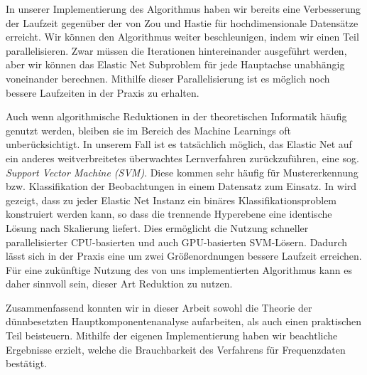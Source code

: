 In unserer Implementierung des Algorithmus haben wir bereits eine Verbesserung der Laufzeit gegenüber der von Zou und Hastie für hochdimensionale Datensätze erreicht. Wir können den Algorithmus weiter beschleunigen, indem wir einen Teil parallelisieren. Zwar müssen die Iterationen hintereinander ausgeführt werden, aber wir können das Elastic Net Subproblem für jede Hauptachse unabhängig voneinander berechnen. Mithilfe dieser Parallelisierung ist es möglich noch bessere Laufzeiten in der Praxis zu erhalten.

Auch wenn algorithmische Reduktionen in der theoretischen Informatik häufig genutzt werden, bleiben sie im Bereich des Machine Learnings oft unberücksichtigt. In unserem Fall ist es tatsächlich möglich, das Elastic Net auf ein anderes weitverbreitetes überwachtes Lernverfahren zurückzuführen, eine sog. \textit{Support Vector Machine (SVM)}. Diese kommen sehr häufig für Mustererkennung bzw. Klassifikation der Beobachtungen in einem Datensatz zum Einsatz. In \cite{zhou} wird gezeigt, dass zu jeder Elastic Net Instanz ein binäres Klassifikationsproblem konstruiert werden kann, so dass die trennende Hyperebene eine identische Lösung nach Skalierung liefert. Dies ermöglicht die Nutzung schneller parallelisierter CPU-basierten und auch GPU-basierten SVM-Lösern. Dadurch lässt sich in der Praxis eine um zwei Größenordnungen bessere Laufzeit erreichen. Für eine zukünftige Nutzung des von uns implementierten Algorithmus kann es daher sinnvoll sein, dieser Art Reduktion zu nutzen.

Zusammenfassend konnten wir in dieser Arbeit sowohl die Theorie der dünnbesetzten Hauptkomponentenanalyse aufarbeiten, als auch einen praktischen Teil beisteuern. Mithilfe der eigenen Implementierung haben wir beachtliche Ergebnisse erzielt, welche die Brauchbarkeit des Verfahrens für Frequenzdaten bestätigt. 
